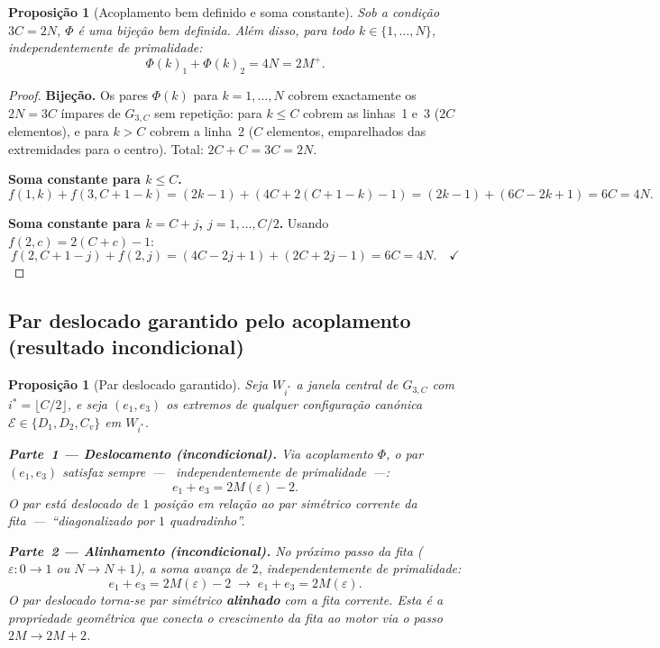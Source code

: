 \documentclass[12pt, a4paper]{article}
\theoremstyle{plain}
\newtheorem{proposition}[theorem]{Proposição}
\theoremstyle{definition}
\theoremstyle{remark}
\begin{document}
	\begin{proposition}[Acoplamento bem definido e soma constante]
		\label{prop:phi}
		Sob a condição $3C=2N$, $\Phi$ é uma bijeção bem definida.
		Além disso, para todo $k\in\{1,\ldots,N\}$, independentemente
		de primalidade:
		\[
		\Phi(k)_1 + \Phi(k)_2 = 4N = 2M^+.
		\]
	\end{proposition}
	
	\begin{proof}
		\textbf{Bijeção.}  Os pares $\Phi(k)$ para $k=1,\ldots,N$ cobrem
		exactamente os $2N=3C$ ímpares de $G_{3,C}$ sem repetição: para
		$k\leq C$ cobrem as linhas~1 e~3 ($2C$ elementos), e para $k>C$
		cobrem a linha~2 ($C$ elementos, emparelhados das extremidades
		para o centro).  Total: $2C+C=3C=2N$. \checkmark
		
		\textbf{Soma constante para $k\leq C$.}
		\[
		f(1,k)+f(3,C+1-k) = (2k-1)+(4C+2(C+1-k)-1)
		= (2k-1)+(6C-2k+1) = 6C = 4N.
		\]
		
		\textbf{Soma constante para $k=C+j$, $j=1,\ldots,C/2$.}
		Usando $f(2,c)=2(C+c)-1$:
		\[
		f(2,C+1-j)+f(2,j)
		= (4C-2j+1)+(2C+2j-1) = 6C = 4N. \quad\checkmark
		\]
	\end{proof}
	
	\subsection{Par deslocado garantido pelo acoplamento
		(resultado incondicional)}
	
	\begin{proposition}[Par deslocado garantido]
		\label{prop:par-deslocado}
		Seja $W_{i^*}$ a janela central de $G_{3,C}$ com
		$i^*=\lfloor C/2\rfloor$, e seja $(e_1,e_3)$ os extremos de
		qualquer configuração canónica
		$\mathcal{E}\in\{D_1,D_2,C_v\}$ em $W_{i^*}$.
		
		\medskip
		\textbf{Parte~1 --- Deslocamento (incondicional).}
		Via acoplamento $\Phi$, o par $(e_1,e_3)$ satisfaz sempre~---~
		independentemente de primalidade~---:
		\[
		e_1 + e_3 = 2M(\varepsilon) - 2.
		\]
		O par está deslocado de $1$ posição em relação ao par simétrico
		corrente da fita~---~``diagonalizado por $1$ quadradinho''.
		
		\medskip
		\textbf{Parte~2 --- Alinhamento (incondicional).}
		No próximo passo da fita ($\varepsilon:0\to1$ ou $N\to N+1$),
		a soma avança de $2$, independentemente de primalidade:
		\[
		e_1 + e_3 = 2M(\varepsilon)-2
		\;\longrightarrow\;
		e_1 + e_3 = 2M(\varepsilon).
		\]
		O par deslocado torna-se par simétrico \textbf{alinhado} com a
		fita corrente.  Esta é a propriedade geométrica que conecta o
		crescimento da fita ao motor via o passo $2M\to2M+2$.
	\end{proposition}
	
\end{document}

